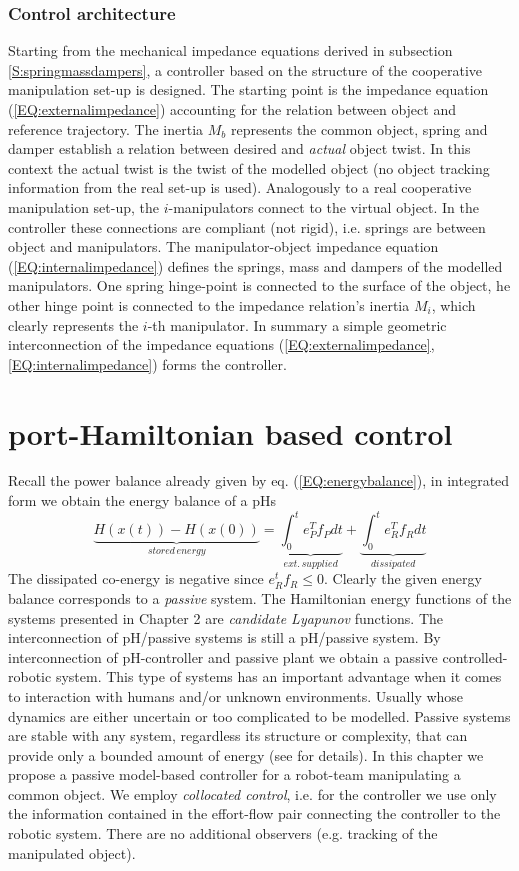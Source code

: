 \documentclass[a4paper,twoside, openright,12pt]{report}
\begin{document}
\subsection{Control architecture}
Starting from the mechanical impedance equations derived in subsection \ref{S:springmassdampers}, a controller based on the structure of the cooperative manipulation set-up is designed. The starting point is the impedance equation (\ref{EQ:externalimpedance}) accounting for the relation between object and reference trajectory. The inertia $M_b$ represents the common object, spring and damper establish a relation between desired and \emph{actual} object twist. In this context the actual twist is the twist of the modelled object (no object tracking information from the real set-up is used). Analogously to a real cooperative manipulation set-up, the $i$-manipulators connect to the virtual object. In the controller these connections are compliant (not rigid), i.e. springs are between object and manipulators. The manipulator-object impedance equation (\ref{EQ:internalimpedance}) defines the springs, mass and dampers of the modelled manipulators. One spring hinge-point is connected to the surface of the object, he other hinge point is connected to the impedance relation's inertia  $M_i$, which clearly represents the $i$-th manipulator. In summary a simple geometric interconnection of the impedance equations (\ref{EQ:externalimpedance},\ref{EQ:internalimpedance}) forms the controller.


\chapter{port-Hamiltonian based control}
Recall the power balance already given by eq. (\ref{EQ:energybalance}), in integrated form we obtain the energy balance of a pHs
\begin{equation}
\underbrace{H(x(t))-H(x(0))}_{stored\, energy} = \underbrace{\int_0^t e_P^Tf_P dt}_{ext.\, supplied} + \underbrace{\int_0^te_R^Tf_R dt}_{dissipated} 
\end{equation}
The dissipated co-energy is negative since $e_R^tf_R \leq 0$. Clearly the given energy balance corresponds to a \emph{passive} system. The Hamiltonian energy functions of the systems presented in Chapter 2 are \emph{candidate Lyapunov} functions. The interconnection of pH/passive systems is still a pH/passive system. By interconnection of pH-controller and passive plant we obtain a passive controlled-robotic system. This type of systems has an important advantage when it comes to interaction with humans and/or unknown environments. Usually whose dynamics are either uncertain or too complicated to be modelled. Passive systems are stable with any system, regardless its structure or complexity, that can provide only a bounded amount of energy (see \cite{Stramigioli_15} for details). In this chapter we propose a passive model-based controller for a robot-team manipulating a common object. We employ \emph{collocated control}, i.e. for the controller we use only the information contained in the effort-flow pair connecting the controller to the robotic system. There are no additional observers (e.g. tracking of the manipulated object).
\end{document}
